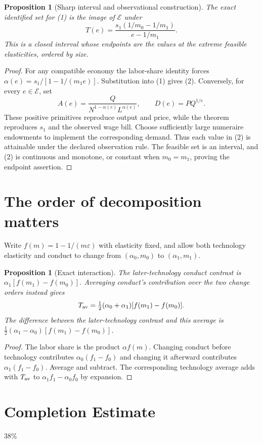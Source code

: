 \documentclass[11pt,a4paper]{article}
\newtheorem{proposition}[theorem]{Proposition}
\theoremstyle{definition}
\theoremstyle{remark}
\begin{document}
\begin{proposition}[Sharp interval and observational construction]
The exact identified set for (1) is the image of $\mathcal E$ under
\[
 T(e)=\frac{s_1(1/m_0-1/m_1)}{e-1/m_1}.\tag{2}
\]
This is a closed interval whose endpoints are the values at the extreme feasible elasticities, ordered by size.
\end{proposition}
\begin{proof}
For any compatible economy the labor-share identity forces
$\alpha(e)=s_1/[1-1/(m_1e)]$. Substitution into (1) gives (2). Conversely, for every $e\in\mathcal E$, set
\[
 A(e)=\frac{Q}{N^{1-\alpha(e)}L^{\alpha(e)}},\qquad D(e)=P Q^{1/e}.
\]
These positive primitives reproduce output and price, while the theorem reproduces $s_1$ and the observed wage bill. Choose sufficiently large numeraire endowments to implement the corresponding demand. Thus each value in (2) is attainable under the declared observation rule. The feasible set is an interval, and (2) is continuous and monotone, or constant when $m_0=m_1$, proving the endpoint assertion.
\end{proof}

\section{The order of decomposition matters}
Write $f(m)=1-1/(m\varepsilon)$ with elasticity fixed, and allow both technology elasticity and conduct to change from $(\alpha_0,m_0)$ to $(\alpha_1,m_1)$.

\begin{proposition}[Exact interaction]
The later-technology conduct contrast is $\alpha_1[f(m_1)-f(m_0)]$. Averaging conduct's contribution over the two change orders instead gives
\[
 T_{\rm av}=\tfrac12(\alpha_0+\alpha_1)[f(m_1)-f(m_0)].
\]
The difference between the later-technology contrast and this average is
$\tfrac12(\alpha_1-\alpha_0)[f(m_1)-f(m_0)]$.
\end{proposition}
\begin{proof}
The labor share is the product $\alpha f(m)$. Changing conduct before technology contributes $\alpha_0(f_1-f_0)$ and changing it afterward contributes $\alpha_1(f_1-f_0)$. Average and subtract. The corresponding technology average adds with $T_{\rm av}$ to $\alpha_1f_1-\alpha_0f_0$ by expansion.
\end{proof}

\section{Completion Estimate}
38\%
\end{document}
